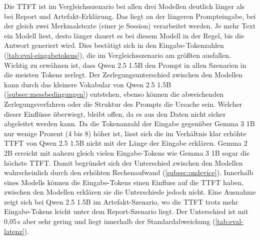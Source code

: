 \noindent Die \ac{TTFT} ist im Vergleichsszenario bei allen drei Modellen deutlich länger als bei Report und Artefakt-Erklärung. Das liegt an der längeren Prompteingabe, bei der gleich zwei Merkmalstexte (einer je Session) verarbeitet werden. Je mehr Text ein Modell liest, desto länger dauert es bei diesem Modell in der Regel, bis die Antwort generiert wird. Dies bestätigt sich in den Eingabe-Tokenzahlen (\autoref{tab:eval-eingabetokens}), die im Vergleichsszenario am größten ausfallen. Wichtig zu erwähnen ist, dass Qwen 2.5 1.5B den Prompt in allen Szenarien in die meisten Tokens zerlegt. Der Zerlegungsunterschied zwischen den Modellen kann durch das kleinere Vokabular von Qwen 2.5 1.5B (\autoref{subsec:messbedingungen}) entstehen, ebenso können die abweichenden Zerlegungsverfahren oder die Struktur des Prompts die Ursache sein. Welcher dieser Einflüsse überwiegt, bleibt offen, da es aus den Daten nicht sicher abgeleitet werden kann. Da die Tokenanzahl der Eingabe gegenüber Gemma 3 1B nur wenige Prozent (4 bis 8) höher ist, lässt sich die im Verhältnis klar erhöhte \ac{TTFT} von Qwen 2.5 1.5B nicht mit der Länge der Eingabe erklären. Gemma 2 2B erreicht mit nahezu gleich vielen Eingabe-Tokens wie Gemma 3 1B sogar die höchste \ac{TTFT}. Damit begründet sich der Unterschied zwischen den Modellen wahrscheinlich durch den erhöhten Rechenaufwand (\autoref{subsec:ondevice}). Innerhalb eines Modells können die Eingabe-Tokens einen Einfluss auf die \ac{TTFT} haben, zwischen den Modellen erklären sie die Unterschiede jedoch nicht. Eine Ausnahme zeigt sich bei Qwen 2.5 1.5B im Artefakt-Szenario, wo die \ac{TTFT} trotz mehr Eingabe-Tokens leicht unter dem Report-Szenario liegt. Der Unterschied ist mit 0,05\,s aber sehr gering und liegt innerhalb der Standardabweichung (\autoref{tab:eval-latenz}).
\vspace{\baselineskip}

